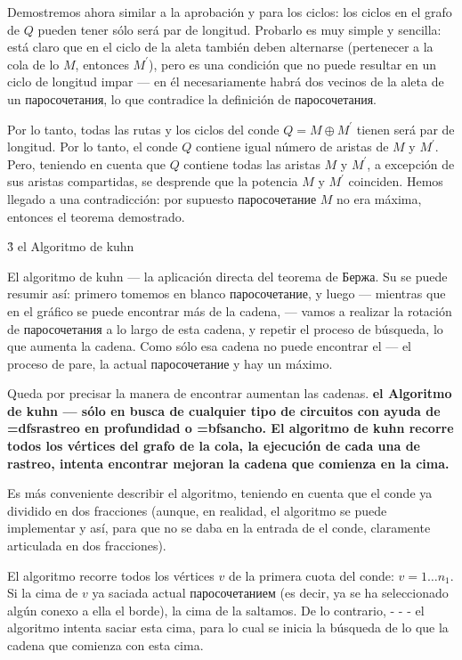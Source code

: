 Demostremos ahora similar a la aprobación y para los ciclos: los ciclos en el grafo de $Q$ pueden tener sólo será par de longitud. Probarlo es muy simple y sencilla: está claro que en el ciclo de la aleta también deben alternarse (pertenecer a la cola de lo $M$, entonces $M^\prime$), pero es una condición que no puede resultar en un ciclo de longitud impar --- en él necesariamente habrá dos vecinos de la aleta de un паросочетания, lo que contradice la definición de паросочетания.

Por lo tanto, todas las rutas y los ciclos del conde $Q = M \oplus M^\prime$ tienen será par de longitud. Por lo tanto, el conde $Q$ contiene igual número de aristas de $M$ y $M^\prime$. Pero, teniendo en cuenta que $Q$ contiene todas las aristas $M$ y $M^\prime$, a excepción de sus aristas compartidas, se desprende que la potencia $M$ y $M^\prime$ coinciden. Hemos llegado a una contradicción: por supuesto паросочетание $M$ no era máxima, entonces el teorema demostrado.


\h3{ el Algoritmo de kuhn }

El algoritmo de kuhn --- la aplicación directa del teorema de Бержа. Su se puede resumir así: primero tomemos en blanco паросочетание, y luego --- mientras que en el gráfico se puede encontrar más de la cadena, --- vamos a realizar la rotación de паросочетания a lo largo de esta cadena, y repetir el proceso de búsqueda, lo que aumenta la cadena. Como sólo esa cadena no puede encontrar el --- el proceso de pare, la actual паросочетание y hay un máximo.

Queda por precisar la manera de encontrar aumentan las cadenas. \bf{el Algoritmo de kuhn} --- sólo en busca de cualquier tipo de circuitos con ayuda de \bf{\algohref=dfs{rastreo en profundidad}} o \bf{\algohref=bfs{ancho}}. El algoritmo de kuhn recorre todos los vértices del grafo de la cola, la ejecución de cada una de rastreo, intenta encontrar mejoran la cadena que comienza en la cima.

Es más conveniente describir el algoritmo, teniendo en cuenta que el conde ya dividido en dos fracciones (aunque, en realidad, el algoritmo se puede implementar y así, para que no se daba en la entrada de el conde, claramente articulada en dos fracciones).

El algoritmo recorre todos los vértices $v$ de la primera cuota del conde: $v = 1 \ldots n_1$. Si la cima de $v$ ya saciada actual паросочетанием (es decir, ya se ha seleccionado algún conexo a ella el borde), la cima de la saltamos. De lo contrario, - - - el algoritmo intenta saciar esta cima, para lo cual se inicia la búsqueda de lo que la cadena que comienza con esta cima.

